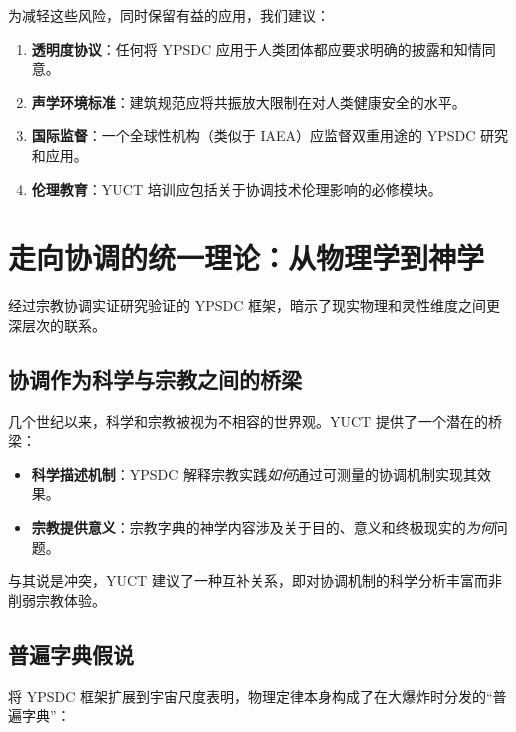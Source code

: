 \documentclass[12pt,a4paper]{article}
\begin{document}
	为减轻这些风险，同时保留有益的应用，我们建议：
	
	\begin{enumerate}
		\item \textbf{透明度协议}：任何将 YPSDC 应用于人类团体都应要求明确的披露和知情同意。
		
		\item \textbf{声学环境标准}：建筑规范应将共振放大限制在对人类健康安全的水平。
		
		\item \textbf{国际监督}：一个全球性机构（类似于 IAEA）应监督双重用途的 YPSDC 研究和应用。
		
		\item \textbf{伦理教育}：YUCT 培训应包括关于协调技术伦理影响的必修模块。
	\end{enumerate}
	
	\section{走向协调的统一理论：从物理学到神学}
	\label{sec:philosophy}
	
	经过宗教协调实证研究验证的 YPSDC 框架，暗示了现实物理和灵性维度之间更深层次的联系。
	
	\subsection{协调作为科学与宗教之间的桥梁}
	
	几个世纪以来，科学和宗教被视为不相容的世界观。YUCT 提供了一个潜在的桥梁：
	
	\begin{itemize}
		\item \textbf{科学描述机制}：YPSDC 解释宗教实践\textit{如何}通过可测量的协调机制实现其效果。
		
		\item \textbf{宗教提供意义}：宗教字典的神学内容涉及关于目的、意义和终极现实的\textit{为何}问题。
	\end{itemize}
	
	与其说是冲突，YUCT 建议了一种互补关系，即对协调机制的科学分析丰富而非削弱宗教体验。
	
	\subsection{普遍字典假说}
	
	将 YPSDC 框架扩展到宇宙尺度表明，物理定律本身构成了在大爆炸时分发的“普遍字典”：
	
\end{document}
